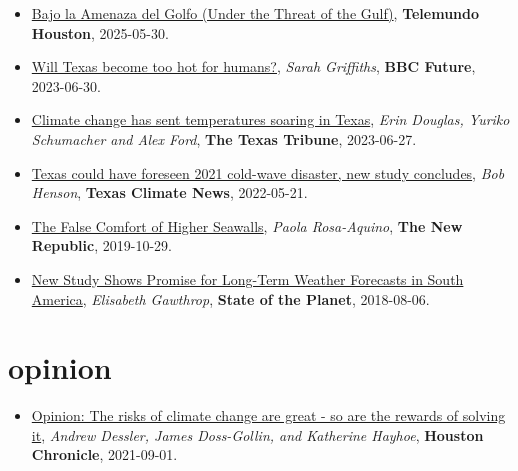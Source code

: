 \documentclass[10pt,oneside]{article}
\begin{document}
\begin{itemize}[label={}]
  
  \item \href{https://www.telemundohouston.com/noticias/bajo-la-amenaza-del-golfo-parte-1-2/2494095/}{Bajo la Amenaza del Golfo (Under the Threat of the Gulf)}, \textbf{Telemundo Houston}, 2025-05-30.
        
  \item \href{https://www.bbc.com/future/article/20230630-will-texas-become-too-hot-for-humans}{Will Texas become too hot for humans?}, \textit{Sarah Griffiths}, \textbf{BBC Future}, 2023-06-30.
        
  \item \href{https://www.texastribune.org/2023/06/27/texas-climate-change-heat/}{Climate change has sent temperatures soaring in Texas}, \textit{Erin Douglas, Yuriko Schumacher and Alex Ford}, \textbf{The Texas Tribune}, 2023-06-27.
        
  \item \href{https://texasclimatenews.org/2022/05/21/texas-could-have-foreseen-2021-cold-wave-disaster-new-study-concludes/}{Texas could have foreseen 2021 cold-wave disaster, new study concludes}, \textit{Bob Henson}, \textbf{Texas Climate News}, 2022-05-21.
        
  \item \href{https://newrepublic.com/article/155519/false-comfort-higher-seawalls}{The False Comfort of Higher Seawalls}, \textit{Paola Rosa-Aquino}, \textbf{The New Republic}, 2019-10-29.
        
  \item \href{https://blogs.ei.columbia.edu/2018/08/06/subseasonal-weather-forecasts-paraguay/}{New Study Shows Promise for Long-Term Weather Forecasts in South America}, \textit{Elisabeth Gawthrop}, \textbf{State of the Planet}, 2018-08-06.
        
\end{itemize}

\section{opinion}

\mbox{}\vspace{-\dimexpr\baselineskip\relax}

\begin{itemize}[label={}]
  
  \item \href{https://www.houstonchronicle.com/opinion/outlook/article/Opinion-The-risks-of-climate-change-are-great-16426616.php}{Opinion: The risks of climate change are great - so are the rewards of solving it}, \textit{Andrew Dessler, James Doss-Gollin, and Katherine Hayhoe}, \textbf{Houston Chronicle}, 2021-09-01.
        
\end{itemize}
\end{document}

